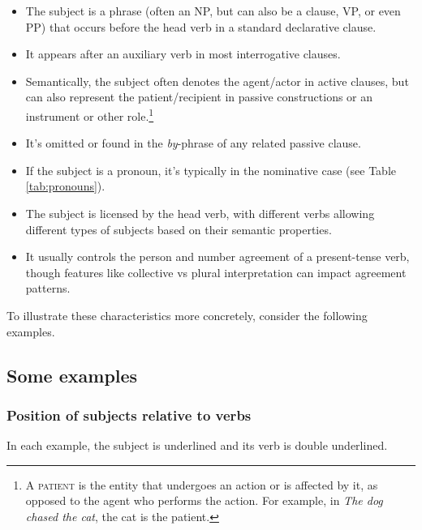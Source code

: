\begin{itemize}[noitemsep]
    \item The subject is a phrase (often an NP, but can also be a clause, VP, or even PP) that occurs before the head verb in a standard declarative clause.
    \item It appears after an auxiliary verb in most interrogative clauses.
    \item Semantically, the subject often denotes the agent/actor in active clauses, but can also represent the patient/recipient in passive constructions or an instrument or other role.\footnote{A \textsc{patient} is the entity that undergoes an action or is affected by it, as opposed to the agent who performs the action. For example, in \textit{The dog chased the cat}, the cat is the patient.}
    \item It's omitted or found in the \textit{by}-phrase of any related passive clause.
    \item If the subject is a pronoun, it's typically in the nominative case (see Table \ref{tab:pronouns}).
    \item The subject is licensed by the head verb, with different verbs allowing different types of subjects based on their semantic properties.
    \item It usually controls the person and number agreement of a present-tense verb, though features like collective vs plural interpretation can impact agreement patterns.
\end{itemize}

To illustrate these characteristics more concretely, consider the following examples.

\subsection{Some examples}

\subsubsection*{Position of subjects relative to verbs}
In each example, the subject is underlined and its verb is double underlined. 

